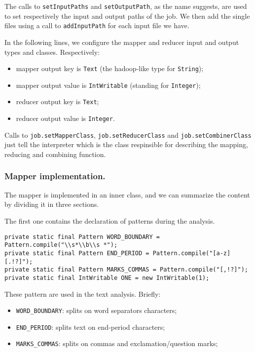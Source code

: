 \documentclass[a4paper,11pt, twoside]{article}
\begin{document}
	The calls to \lstinline|setInputPaths| and \lstinline|setOutputPath|, as the name suggests, are used to set respectively the input and output paths of the job. We then add the single files using a call to \lstinline|addInputPath| for each input file we have. 
	
	\bigskip
	\noindent
	In the following lines, we configure the mapper and reducer input and output types and classes.
	Respectively: \begin{itemize}
		\item mapper output key is \lstinline|Text| (the hadoop-like type for \lstinline|String|);
		\item mapper output value is \lstinline|IntWritable| (standing for \lstinline|Integer|);
		\item reducer output key is \lstinline|Text|;
		\item reducer output value is \lstinline|Integer|.
	\end{itemize}

	Calls to \lstinline|job.setMapperClass|, \lstinline|job.setReducerClass| and \lstinline|job.setCombinerClass| just tell the interpreter which is the class respinsible for describing the mapping, reducing and combining function.
	
	\subsubsection{Mapper implementation.} The mapper is implemented in an inner class, and we can summarize the content by dividing it in three sections.
	
	The first one contains the declaration of patterns during the analysis.
	
	\begin{lstlisting}[firstnumber=70, caption={Declaration of Regular Expression Patterns}, captionpos=b]
private static final Pattern WORD_BOUNDARY = Pattern.compile("\\s*\\b\\s *");
private static final Pattern END_PERIOD = Pattern.compile("[a-z][.!?]");
private static final Pattern MARKS_COMMAS = Pattern.compile("[,!?]");
private static final IntWritable ONE = new IntWritable(1);
	\end{lstlisting}
	
	These pattern are used in the text analysis. Briefly: \begin{itemize}
		\item \lstinline|WORD_BOUNDARY|: splits on word separators characters;
		\item \lstinline|END_PERIOD|: splits text on end-period characters;
		\item \lstinline|MARKS_COMMAS|: splits on commas and exclamation/question marks;
	\end{itemize}
\end{document}
